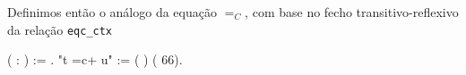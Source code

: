 
    



Definimos então o análogo da equação $=_C$, com base no fecho
transitivo-reflexivo da relação \texttt{eqc\_ctx}

\bigskip
\coqnoindent{}  (
: ) := 
 
.\coqdoceol {} "t =c+ u" := (  )
(  66).\coqdoceol

